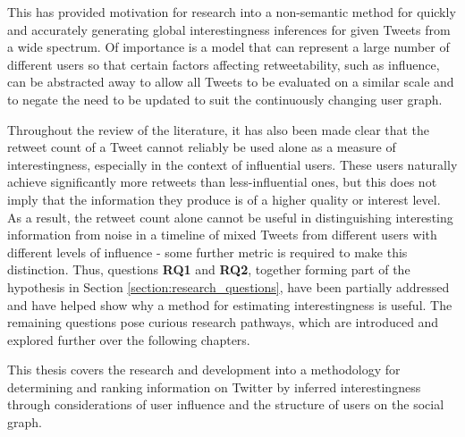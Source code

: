 This has provided motivation for research into a non-semantic method for quickly and accurately generating global interestingness inferences for given Tweets from a wide spectrum. Of importance is a model that can represent a large number of different users so that certain factors affecting retweetability, such as influence, can be abstracted away to allow all Tweets to be evaluated on a similar scale and to negate the need to be updated to suit the continuously changing user graph.

Throughout the review of the literature, it has also been made clear that the retweet count of a Tweet cannot reliably be used alone as a measure of interestingness, especially in the context of influential users. These users naturally achieve significantly more retweets than less-influential ones, but this does not imply that the information they produce is of a higher quality or interest level. As a result, the retweet count alone cannot be useful in distinguishing interesting information from noise in a timeline of mixed Tweets from different users with different levels of influence - some further metric is required to make this distinction. Thus, questions \textbf{RQ1} and \textbf{RQ2}, together forming part of the hypothesis in Section \ref{section:research_questions}, have been partially addressed and have helped show why a method for estimating interestingness is useful. The remaining questions pose curious research pathways, which are introduced and explored further over the following chapters.

This thesis covers the research and development into a methodology for determining and ranking information on Twitter by inferred interestingness through considerations of user influence and the structure of users on the social graph.
